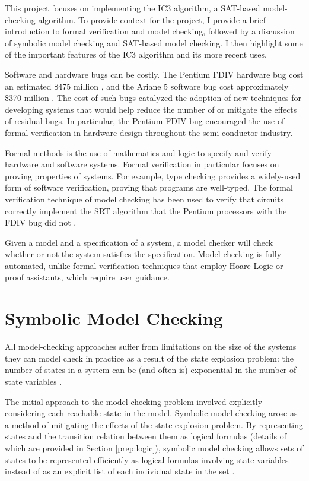 \documentclass[12pt,a4paper,twoside,openright]{report}
\begin{document}
This project focuses on implementing the IC3 algorithm, a SAT-based model-checking
algorithm.
To provide context for the project,
I provide a brief introduction to formal verification and model checking, followed
by a discussion of symbolic model checking and SAT-based model checking.
I then highlight some of the important features of the IC3 algorithm and its more
recent uses.

Software and hardware bugs can be costly. The Pentium FDIV hardware bug cost an
estimated \$475 million \cite{pratt95}, and the Ariane 5 software bug cost
approximately \$370 million \cite{dowson97}.
The cost of such bugs catalyzed the adoption of new techniques for developing systems
that would help reduce the number of or mitigate the effects of residual bugs.
In particular, the Pentium FDIV bug encouraged the use of formal verification in
hardware design throughout the semi-conductor industry.

Formal methods is the use of mathematics and logic to specify and verify hardware and
software systems. Formal verification in particular focuses on proving properties of
systems.
For example, type checking provides a widely-used form of software verification,
proving that programs are well-typed. The formal verification technique of model
checking has been used to verify that circuits correctly implement the SRT
algorithm that the Pentium processors with the FDIV bug did not \cite{clarke96}.

Given a model and a specification of a system, a model checker will check whether or
not the system satisfies the specification.
Model checking is fully automated, unlike formal verification techniques that employ
Hoare Logic or proof assistants, which require user guidance.

\section{Symbolic Model Checking}

All model-checking approaches suffer from limitations on the size
of the systems they can model check in practice as a result of
the state explosion problem: the number of
states in a system can be (and often is) exponential in the
number of state variables \cite{clarke12}. 

The initial approach to the model checking problem involved explicitly
considering each reachable state in the model.
Symbolic model checking arose as a method of mitigating the effects of
the state explosion problem. By representing
states and the transition relation between them as logical formulas
(details of which are provided in Section \ref{prep:logic}),
symbolic model checking allows sets of states to be
represented efficiently as logical formulas involving state variables
instead of as an explicit list of each individual state in the set
\cite{mcmillan92}. 
\end{document}
